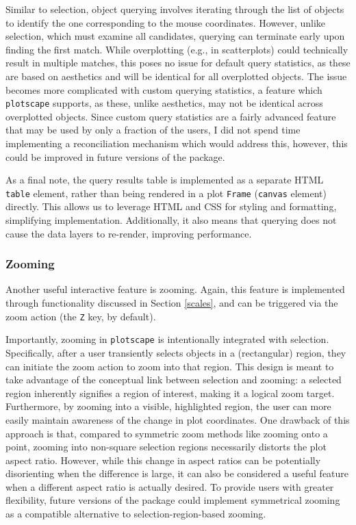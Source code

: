 \documentclass[
  openany]{book}
\theoremstyle{definition}
\theoremstyle{definition}
\theoremstyle{definition}
\theoremstyle{definition}
\theoremstyle{remark}
\begin{document}
Similar to selection, object querying involves iterating through the list of objects to identify the one corresponding to the mouse coordinates. However, unlike selection, which must examine all candidates, querying can terminate early upon finding the first match. While overplotting (e.g., in scatterplots) could technically result in multiple matches, this poses no issue for default query statistics, as these are based on aesthetics and will be identical for all overplotted objects. The issue becomes more complicated with custom querying statistics, a feature which \texttt{plotscape} supports, as these, unlike aesthetics, may not be identical across overplotted objects. Since custom query statistics are a fairly advanced feature that may be used by only a fraction of the users, I did not spend time implementing a reconciliation mechanism which would address this, however, this could be improved in future versions of the package.

As a final note, the query results table is implemented as a separate HTML \texttt{table} element, rather than being rendered in a plot \texttt{Frame} (\texttt{canvas} element) directly. This allows us to leverage HTML and CSS for styling and formatting, simplifying implementation. Additionally, it also means that querying does not cause the data layers to re-render, improving performance.

\subsubsection{Zooming}\label{zooming-1}

Another useful interactive feature is zooming. Again, this feature is implemented through functionality discussed in Section \ref{scales}, and can be triggered via the zoom action (the \texttt{Z} key, by default).

Importantly, zooming in \texttt{plotscape} is intentionally integrated with selection. Specifically, after a user transiently selects objects in a (rectangular) region, they can initiate the zoom action to zoom into that region. This design is meant to take advantage of the conceptual link between selection and zooming: a selected region inherently signifies a region of interest, making it a logical zoom target. Furthermore, by zooming into a visible, highlighted region, the user can more easily maintain awareness of the change in plot coordinates. One drawback of this approach is that, compared to symmetric zoom methods like zooming onto a point, zooming into non-square selection regions necessarily distorts the plot aspect ratio. However, while this change in aspect ratios can be potentially disorienting when the difference is large, it can also be considered a useful feature when a different aspect ratio is actually desired. To provide users with greater flexibility, future versions of the package could implement symmetrical zooming as a compatible alternative to selection-region-based zooming.
\end{document}
